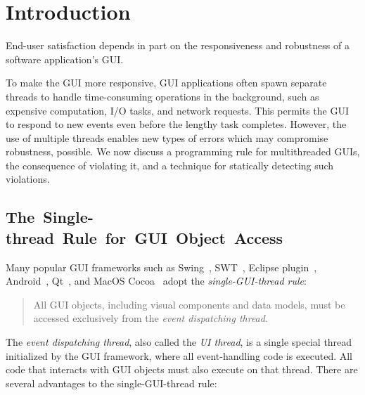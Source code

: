 \section{Introduction}
\label{sec:introduction}

End-user satisfaction depends in part on the responsiveness and
robustness of a software application's GUI.

To make the GUI more responsive, 
GUI applications often spawn separate threads to handle time-consuming
operations in the background, such as expensive computation, I/O tasks,
and network requests. This permits the GUI to respond to new events
even before the lengthy task completes. However, the use of multiple threads
enables new types of errors which may compromise robustness, possible.
We now discuss a programming rule for multithreaded GUIs, the consequence
of violating it, and a technique for statically detecting such violations.



\subsection{\hspace{-1.1ex}\mbox{The}~\mbox{Single-thread}~\mbox{Rule}~\mbox{for}~\mbox{GUI}~\mbox{Object}~\mbox{Access}}

Many popular GUI frameworks such as Swing~\cite{swing}, SWT~\cite{swt}, Eclipse plugin~\cite{eclipse},
Android~\cite{android}, Qt~\cite{qt}, and MacOS Cocoa~\cite{macos}
adopt the \textit{single-GUI-thread rule}:

\vspace{-2mm}

\begin{quote}
All GUI objects, including visual components and data models, must be
 accessed exclusively from the \textit{event dispatching thread}.
\end{quote}

\vspace{-2mm}

The \textit{event dispatching thread}, also called the \textit{UI thread}, is a single
special thread initialized by the GUI framework, where all event-handling code
is executed. All code that interacts with GUI objects must also
execute on that thread.  There are several advantages to the single-GUI-thread rule:

